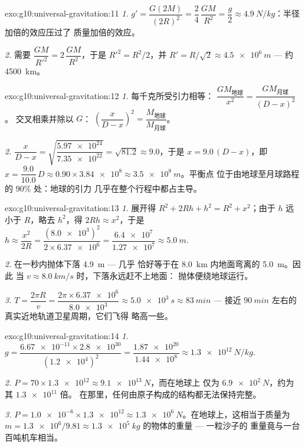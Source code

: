 \begin{solution}{exo:g10:universal-gravitation:11}
\emph{1.} $g' = \dfrac{G (2M)}{(2R)^2} = \dfrac{2}{4}\,\dfrac{GM}{R^2}
= \dfrac{g}{2} \approx \qty{4.9}{N/kg}$：半径加倍的效应压过了
质量加倍的效应。

\emph{2.} 需要 $\dfrac{GM}{R'^2} = 2\,\dfrac{GM}{R^2}$，于是
$R'^2 = R^2/2$，并 $R' = R/\sqrt{2} \approx \qty{4.5e6}{m}$ ---
约 \qty{4500}{km}。
\end{solution}

\begin{solution}{exo:g10:universal-gravitation:12}
\emph{1.} 每千克所受引力相等：
$\dfrac{G M_{\text{地球}}}{x^2} = \dfrac{G M_{\text{月球}}}{(D-x)^2}$。
交叉相乘并除以 $G$：
$\left(\dfrac{x}{D-x}\right)^2 = \dfrac{M_{\text{地球}}}{M_{\text{月球}}}$。

\emph{2.} $\dfrac{x}{D-x}
= \sqrt{\dfrac{\num{5.97e24}}{\num{7.35e22}}} = \sqrt{81.2} \approx
9.0$，于是 $x = 9.0\,(D - x)$，即 $x = \dfrac{9.0}{10.0}\,D
\approx 0.90 \times \num{3.84e8} \approx \qty{3.5e8}{m}$。平衡点
位于由地球至月球路程的 $90\%$ 处：地球的引力
几乎在整个行程中都占主导。
\end{solution}

\begin{solution}{exo:g10:universal-gravitation:13}
\emph{1.} 展开得 $R^2 + 2Rh + h^2 = R^2 + x^2$；由于 $h$ 远小于
$R$，略去 $h^2$，得 $2Rh \approx x^2$，于是
$h \approx \dfrac{x^2}{2R}
= \dfrac{(\num{8.0e3})^2}{2 \times \num{6.37e6}}
= \dfrac{\num{6.4e7}}{\num{1.27e7}} \approx \qty{5.0}{m}$.

\emph{2.} 在一秒内抛体下落 \qty{4.9}{m} --- 几乎
恰好等于在 \qty{8.0}{km} 内地面弯离的 \qty{5.0}{m}。因此
当 $v \approx \qty{8.0}{km/s}$ 时，下落永远赶不上地面：
抛体便绕地球运行。

\emph{3.} $T = \dfrac{2\pi R}{v}
= \dfrac{2\pi \times \num{6.37e6}}{\num{8.0e3}}
\approx \qty{5.0e3}{s} \approx \qty{83}{min}$ --- 接近
$\qty{90}{min}$ 左右的真实近地轨道卫星周期，它们飞得
略高一些。
\end{solution}

\begin{solution}{exo:g10:universal-gravitation:14}
\emph{1.} $g = \dfrac{\num{6.67e-11} \times \num{2.8e30}}
{(\num{1.2e4})^2} = \dfrac{\num{1.87e20}}{\num{1.44e8}}
\approx \qty{1.3e12}{N/kg}.$

\emph{2.} $P = 70 \times \num{1.3e12} \approx \qty{9.1e13}{N}$，而在地球上
仅为 $\qty{6.9e2}{N}$，约为其 $\num{1.3e11}$ 倍。
在那里，任何由原子构成的结构都无法保持完整。

\emph{3.} $P = \num{1.0e-6} \times \num{1.3e12} \approx
\qty{1.3e6}{N}$。在地球上，这相当于质量为
$m = \num{1.3e6}/9.81 \approx \qty{1.3e5}{kg}$ 的物体的重量 --- 一粒沙子的
重量竟与一台百吨机车相当。
\end{solution}

